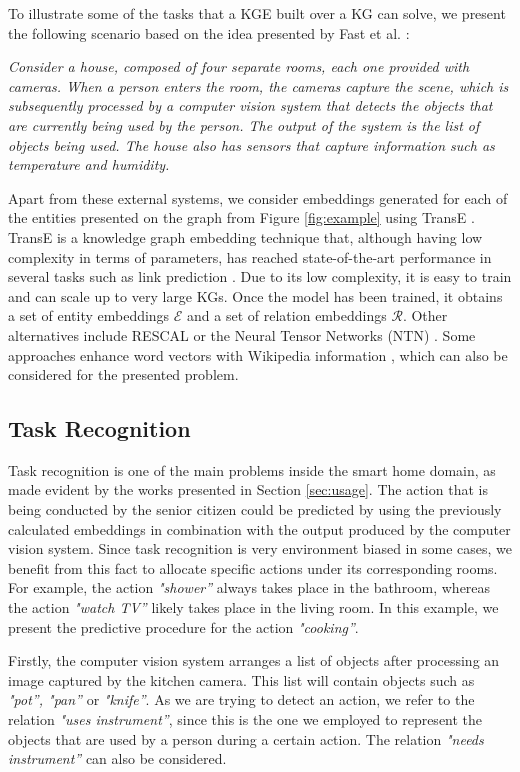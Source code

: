 To illustrate some of the tasks that a KGE built over a KG can solve, we present the following scenario based on the idea presented by Fast et al. \citep{fastetal}:

\textit{Consider a house, composed of four separate rooms, each one provided with cameras. When a person enters the room, the cameras capture the scene, which is subsequently processed by a computer vision system that detects the objects that are currently being used by the person. The output of the system is the list of objects being used. The house also has sensors that capture information such as temperature and humidity.}

Apart from these external systems, we consider embeddings generated for each of the entities presented on the graph from Figure \ref{fig:example} using TransE \citep{transe}. TransE is a knowledge graph embedding technique that, although having low complexity in terms of parameters, has reached state-of-the-art performance in several tasks such as link prediction \citep{kgeconv}. Due to its low complexity, it is easy to train and can scale up to very large KGs. Once the model has been trained, it obtains a set of entity embeddings $\mathcal{E}$ and a set of relation embeddings $\mathcal{R}$. Other alternatives include  RESCAL \citep{rescal} or the Neural Tensor Networks (NTN) \citep{ntn}. Some approaches enhance word vectors with Wikipedia information \citep{deMelo}, which can also be considered for the presented problem.


\subsection{Task Recognition} 
Task recognition is one of the main problems inside the smart home domain, as made evident by the works presented in Section \ref{sec:usage}. The action that is being conducted by the senior citizen could be predicted by using the previously calculated embeddings in combination with the output produced by the computer vision system. Since task recognition is very environment biased in some cases, we benefit from this fact to allocate specific actions under its corresponding rooms. For example, the action \textit{"shower''} always takes place in the bathroom, whereas the action \textit{"watch TV''} likely takes place in the living room. In this example, we present the predictive procedure for the action \textit{"cooking''}.

Firstly, the computer vision system arranges a list of objects after processing an image captured by the kitchen camera. This list will contain objects such as \textit{"pot'', "pan''} or \textit{"knife''}. As we are trying to detect an action, we refer to the relation \textit{"uses instrument''}, since this is the one we employed to represent the objects that are used by a person during a certain action. The relation \textit{"needs instrument''} can also be considered. 

